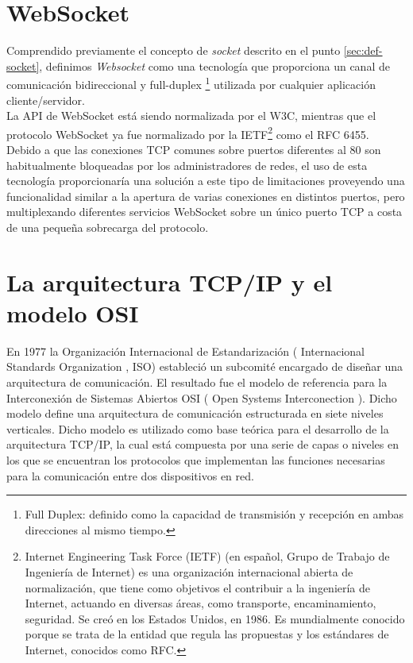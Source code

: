 \section{WebSocket}
\label{sec:def-websocket}

Comprendido previamente el concepto de \emph{socket} descrito en el punto \ref{sec:def-socket}, definimos  \emph{Websocket} como una tecnología que proporciona un canal de comunicación bidireccional y full-duplex 
\footnote{Full Duplex: definido como la capacidad de transmisión y recepción en ambas direcciones al mismo tiempo. } utilizada por cualquier aplicación cliente/servidor.\\


La API de WebSocket está siendo normalizada por el W3C, mientras que el protocolo WebSocket ya fue normalizado por la IETF\footnote{Internet Engineering Task Force (IETF) (en español, Grupo de Trabajo de Ingeniería de Internet)
es una organización internacional abierta de normalización, que tiene como objetivos el contribuir a la ingeniería de Internet, actuando en diversas áreas, como transporte, encaminamiento, seguridad.
Se creó en los Estados Unidos, en 1986. Es mundialmente conocido porque se trata de la entidad que regula las propuestas y los estándares de Internet, conocidos como RFC.} como el RFC 6455.\\

Debido a que las conexiones TCP comunes sobre puertos diferentes al 80 son habitualmente bloqueadas por los administradores de redes, el uso de esta tecnología proporcionaría una solución
a este tipo de limitaciones proveyendo una funcionalidad similar a la apertura de varias conexiones en distintos puertos, pero multiplexando diferentes servicios WebSocket sobre un único
puerto TCP a costa de una pequeña sobrecarga del protocolo.\\

\section{La arquitectura TCP/IP y el modelo OSI}
\label{sec:modelo-osi}

En 1977 la Organización Internacional de Estandarización ( Internacional Standards Organization , ISO) estableció un subcomité encargado de diseñar una arquitectura de
comunicación. El resultado fue el modelo de referencia para la Interconexión de Sistemas Abiertos OSI ( Open Systems Interconection ). Dicho modelo define una arquitectura de
comunicación estructurada en siete niveles verticales. Dicho modelo es utilizado como base teórica para el desarrollo de la arquitectura TCP/IP, la cual está compuesta por una serie de capas
o niveles en los que se encuentran los protocolos que implementan las funciones necesarias para la comunicación entre dos dispositivos en red.\\

